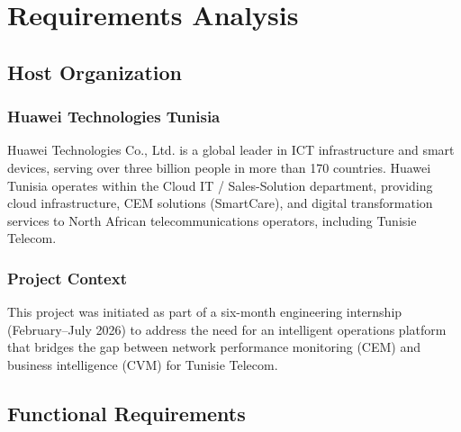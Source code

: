 \chapter{Requirements Analysis}
\label{ch:requirements}

\section{Host Organization}

\subsection{Huawei Technologies Tunisia}

Huawei Technologies Co., Ltd. is a global leader in ICT infrastructure and smart devices, serving over three billion people in more than 170 countries. Huawei Tunisia operates within the Cloud IT / Sales-Solution department, providing cloud infrastructure, CEM solutions (SmartCare), and digital transformation services to North African telecommunications operators, including Tunisie Telecom.

\subsection{Project Context}

This project was initiated as part of a six-month engineering internship (February--July 2026) to address the need for an intelligent operations platform that bridges the gap between network performance monitoring (CEM) and business intelligence (CVM) for Tunisie Telecom.

\section{Functional Requirements}

